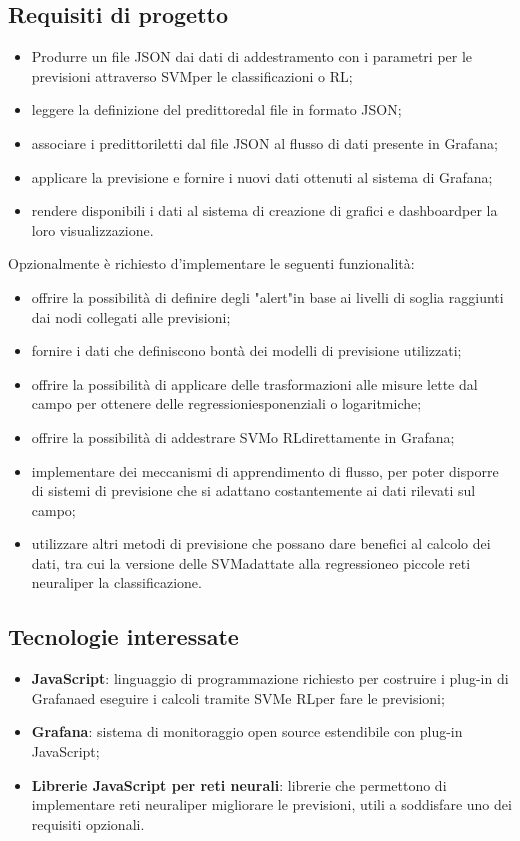 \subsection{Requisiti di progetto}
\begin{itemize}
	\item Produrre un file JSON dai dati di addestramento con i parametri per le previsioni attraverso SVM\glosp per le classificazioni o RL\glo;
	\item leggere la definizione del predittore\glosp dal file in formato JSON;
	\item associare i predittori\glosp letti dal file JSON al flusso di dati presente in Grafana\glo;
	\item applicare la previsione e fornire i nuovi dati ottenuti al sistema di Grafana\glo;
	\item rendere disponibili i dati al sistema di creazione di grafici e dashboard\glosp per la loro visualizzazione.
\end{itemize}
Opzionalmente è richiesto d'implementare le seguenti funzionalità:
\begin{itemize}
	\item offrire la possibilità di definire degli "alert"\glosp in base ai livelli di soglia raggiunti dai nodi collegati alle previsioni;
	\item fornire i dati che definiscono bontà dei modelli di previsione utilizzati;
	\item offrire la possibilità di applicare delle trasformazioni alle misure lette dal campo per ottenere delle regressioni\glosp esponenziali o logaritmiche;
	\item offrire la possibilità di addestrare SVM\glosp o RL\glosp direttamente in Grafana\glo;
	\item implementare dei meccanismi di apprendimento di flusso, per poter disporre di sistemi di previsione che si adattano costantemente ai dati rilevati sul campo;
	\item utilizzare altri metodi di previsione che possano dare benefici al calcolo dei dati, tra cui la versione delle SVM\glosp adattate alla regressione\glosp o piccole reti neurali\glosp per la classificazione.
\end{itemize}

\subsection{Tecnologie interessate}
\begin{itemize}
	\item \textbf{JavaScript}: linguaggio di programmazione richiesto per costruire i plug-in di Grafana\glosp ed eseguire i calcoli tramite SVM\glosp e RL\glosp per fare le previsioni;
	\item \textbf{Grafana}: sistema di monitoraggio open source estendibile con plug-in JavaScript;
	\item \textbf{Librerie JavaScript per reti neurali}\glo: librerie che permettono di implementare reti neurali\glosp per migliorare le previsioni, utili a soddisfare uno dei requisiti opzionali.
\end{itemize}

